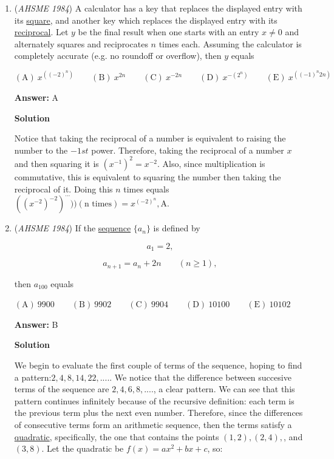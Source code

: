 \begin{enumerate}
 


	\item (\textit{AHSME 1984}) A calculator has a key that replaces the displayed entry with its \href{https://artofproblemsolving.com/wiki/index.php?title=Perfect\_square}{square}, and another key which replaces the displayed entry with its \href{https://artofproblemsolving.com/wiki/index.php?title=Reciprocal}{reciprocal}. Let $y$ be the final result when one starts with an entry $x\not=0$ and alternately squares and reciprocates $n$ times each. Assuming the calculator is completely accurate (e.g. no roundoff or overflow), then $y$ equals


 $\mathrm{(A) \ }x^{((-2)^n)} \qquad \mathrm{(B) \ }x^{2n} \qquad \mathrm{(C) \ } x^{-2n} \qquad \mathrm{(D) \ }x^{-(2^n)} \qquad \mathrm{(E) \ } x^{((-1)^n2n)}$

 \textbf{Answer: }A



\textbf{Solution}

Notice that taking the reciprocal of a number is equivalent to raising the number to the $-1st$ power. Therefore, taking the reciprocal of a number $x$ and then squaring it is $(x^{-1})^2=x^{-2}$. Also, since multiplication is commutative, this is equivalent to squaring the number then taking the reciprocal of it. Doing this $n$ times equals $\left(\left(x^{-2}\right)^{-2}\right)^{\cdots})) (\text{n times})=x^{(-2)^n}, \boxed{\text{A}}$.

 


	\item (\textit{AHSME 1984}) If the \href{https://artofproblemsolving.com/wiki/index.php?title=Sequence}{sequence} $\{a_n\}$ is defined by


 
 \[a_1=2,\]

 \[a_{n+1}=a_n+2n \qquad (n \geq 1),\]


 then $a_{100}$ equals


 $\mathrm{(A) \ }9900 \qquad \mathrm{(B) \ }9902 \qquad \mathrm{(C) \ } 9904 \qquad \mathrm{(D) \ }10100 \qquad \mathrm{(E) \ } 10102$

 \textbf{Answer: }B



\textbf{Solution}

We begin to evaluate the first couple of terms of the sequence, hoping to find a pattern:$2, 4, 8, 14, 22, ....$. We notice that the difference between succesive terms of the sequence are $2, 4, 6, 8, ....$, a clear pattern. We can see that this pattern continues infinitely because of the recursive definition: each term is the previous term plus the next even number. Therefore, since the differences of consecutive terms form an arithmetic sequence, then the terms satisfy a \href{https://artofproblemsolving.com/wiki/index.php?title=Quadratic}{quadratic}, specifically, the one that contains the points $(1, 2), (2, 4),$, and $(3, 8)$. Let the quadratic be $f(x)=ax^2+bx+c$, so:


\end{enumerate}

